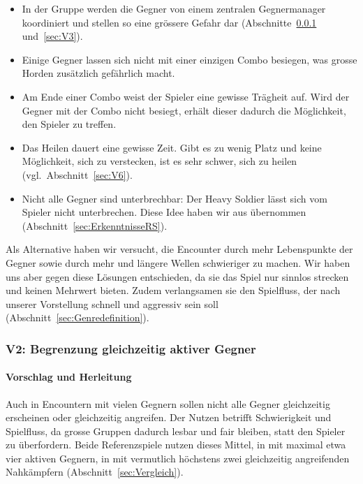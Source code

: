 \documentclass[../Main.tex]{subfiles}
\begin{document}
\begin{itemize}[leftmargin=1.5cm]
    \item In der Gruppe werden die Gegner von einem zentralen Gegnermanager koordiniert und stellen so eine grössere Gefahr dar (Abschnitte~\ref{sec:V2} und~\ref{sec:V3}).
    \item Einige Gegner lassen sich nicht mit einer einzigen Combo besiegen, was grosse Horden zusätzlich gefährlich macht.
    \item Am Ende einer Combo weist der Spieler eine gewisse Trägheit auf. Wird der Gegner mit der Combo nicht besiegt, erhält dieser dadurch die Möglichkeit, den Spieler zu treffen.
    \item Das Heilen dauert eine gewisse Zeit. Gibt es zu wenig Platz und keine Möglichkeit, sich zu verstecken, ist es sehr schwer, sich zu heilen (vgl.~Abschnitt~\ref{sec:V6}).
    \item Nicht alle Gegner sind unterbrechbar: Der Heavy Soldier lässt sich vom Spieler nicht unterbrechen. Diese Idee haben wir aus  übernommen (Abschnitt~\ref{sec:ErkenntnisseRS}).
\end{itemize}

Als Alternative haben wir versucht, die Encounter durch mehr Lebenspunkte der Gegner sowie durch mehr und längere Wellen schwieriger zu machen. Wir haben uns aber gegen diese Lösungen entschieden, da sie das Spiel nur sinnlos strecken und keinen Mehrwert bieten. Zudem verlangsamen sie den Spielfluss, der nach unserer Vorstellung schnell und aggressiv sein soll (Abschnitt~\ref{sec:Genredefinition}).

\subsubsection{V2: Begrenzung gleichzeitig aktiver Gegner} \label{sec:V2}

\paragraph{Vorschlag und Herleitung}
Auch in Encountern mit vielen Gegnern sollen nicht alle Gegner gleichzeitig erscheinen oder gleichzeitig angreifen. Der Nutzen betrifft Schwierigkeit und Spielfluss, da grosse Gruppen dadurch lesbar und fair bleiben, statt den Spieler zu überfordern. Beide Referenzspiele nutzen dieses Mittel, in  mit maximal etwa vier aktiven Gegnern, in  mit vermutlich höchstens zwei gleichzeitig angreifenden Nahkämpfern (Abschnitt~\ref{sec:Vergleich}).
\end{document}
